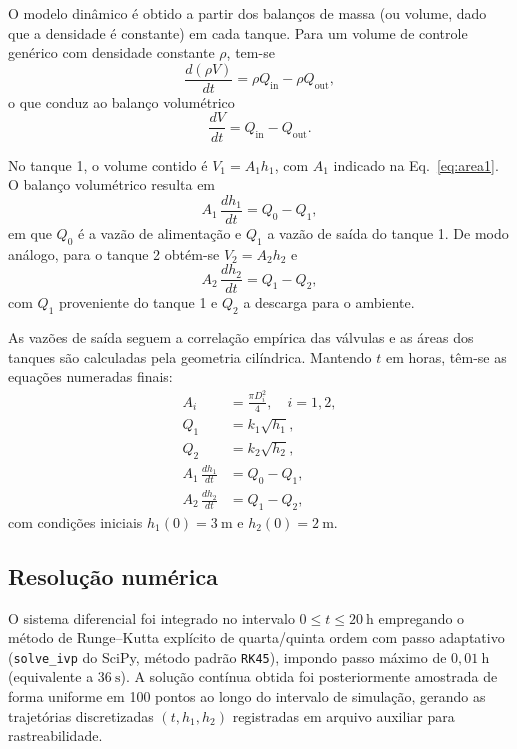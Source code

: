 \documentclass{article}
\begin{document}
O modelo dinâmico é obtido a partir dos balanços de massa (ou volume, dado que a densidade é constante) em cada tanque. Para um volume de controle genérico com densidade constante $\rho$, tem-se
\begin{equation*}
  \frac{d(\rho V)}{dt} = \rho Q_{\text{in}} - \rho Q_{\text{out}},
\end{equation*}
o que conduz ao balanço volumétrico
\begin{equation*}
  \frac{dV}{dt} = Q_{\text{in}} - Q_{\text{out}}.
\end{equation*}

No tanque 1, o volume contido é $V_1 = A_1 h_1$, com $A_1$ indicado na Eq.~\eqref{eq:area1}. O balanço volumétrico resulta em
\begin{equation*}
  A_1\,\frac{dh_1}{dt} = Q_0 - Q_1,
\end{equation*}
em que $Q_0$ é a vazão de alimentação e $Q_1$ a vazão de saída do tanque 1. De modo análogo, para o tanque 2 obtém-se $V_2 = A_2 h_2$ e
\begin{equation*}
  A_2\,\frac{dh_2}{dt} = Q_1 - Q_2,
\end{equation*}
com $Q_1$ proveniente do tanque 1 e $Q_2$ a descarga para o ambiente.

As vazões de saída seguem a correlação empírica das válvulas e as áreas dos tanques são calculadas pela geometria cilíndrica. Mantendo $t$ em horas, têm-se as equações numeradas finais:
\begin{align}
  A_i &= \frac{\pi D_i^2}{4}, \quad i = 1,2, \label{eq:area1} \\
  Q_1 &= k_1 \sqrt{h_1}, \label{eq:Q1} \\
  Q_2 &= k_2 \sqrt{h_2}, \label{eq:Q2} \\
  A_1\,\frac{dh_1}{dt} &= Q_0 - Q_1, \label{eq:balanco1} \\
  A_2\,\frac{dh_2}{dt} &= Q_1 - Q_2, \label{eq:balanco2}
\end{align}
com condições iniciais $h_1(0) = 3\ \mathrm{m}$ e $h_2(0) = 2\ \mathrm{m}$. 

\subsection*{Resolução numérica}
O sistema diferencial foi integrado no intervalo $0 \leq t \leq 20\ \mathrm{h}$ empregando o método de Runge--Kutta explícito de quarta/quinta ordem com passo adaptativo (\texttt{solve\_ivp} do SciPy, método padrão \texttt{RK45}), impondo passo máximo de $0{,}01\ \mathrm{h}$ (equivalente a $36\ \mathrm{s}$). A solução contínua obtida foi posteriormente amostrada de forma uniforme em 100 pontos ao longo do intervalo de simulação, gerando as trajetórias discretizadas $(t, h_1, h_2)$ registradas em arquivo auxiliar para rastreabilidade.
\end{document}
